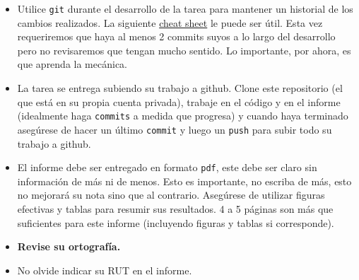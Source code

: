 \documentclass[letter, 11pt]{article}
\begin{document}
\vspace{1em}
\begin{itemize}

  \item Utilice \texttt{git} durante el desarrollo de la tarea para mantener un
      historial de los cambios realizados. La siguiente
      \href{https://education.github.com/git-cheat-sheet-education.pdf}{cheat
      sheet} le puede ser útil. Esta vez requeriremos que haya al menos 2
      commits suyos a lo largo del desarrollo pero no revisaremos que tengan
      mucho sentido. Lo importante, por ahora, es que aprenda la mecánica.

  \item La tarea se entrega subiendo su trabajo a github. Clone este
      repositorio (el que está en su propia cuenta privada), trabaje en el
      código y en el informe (idealmente haga \texttt{commits} a medida que
      progresa) y cuando haya terminado asegúrese de hacer un último
      \texttt{commit} y luego un \texttt{push} para subir todo su trabajo a
      github.

  \item El informe debe ser entregado en formato \texttt{pdf}, este debe ser
      claro sin información de más ni de menos. Esto es importante, no escriba
      de más, esto no mejorará su nota sino que al contrario. Asegúrese de
      utilizar figuras efectivas y tablas para resumir sus resultados. 4 a 5
      páginas son más que suficientes para este informe (incluyendo figuras y
      tablas si corresponde).
  \item {\bf Revise su ortografía.}

  \item No olvide indicar su RUT en el informe.

\end{itemize}

\end{document}
